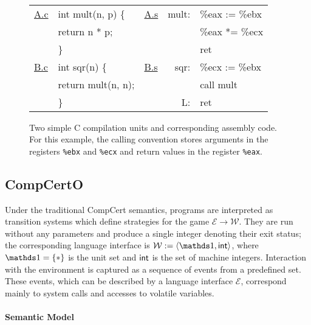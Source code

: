 \documentclass[sigplan,screen]{acmart}
\newcommand{\figsize}{\small}
\begin{document}
\begin{figure} %
  \figsize
  \tt
  \begin{tabular}{ll lr@{\ }l}
    \hline
    \underline{A.c} & int mult(n, p) \{ &
    \underline{A.s} & mult: & \%eax := \%ebx \\
                    & \quad return n * p; &
                    & & \%eax *= \%ecx \\
                    & \} &
                    & & ret \\
    \hline
    \underline{B.c} & int sqr(n) \{ &
    \underline{B.s} & sqr: & \%ecx := \%ebx \\
                    & \quad return mult(n, n); &
                    & & call mult \\
                    & \} &
                    & L: & ret \\
    \hline
  \end{tabular}
  \caption{Two simple C compilation units and corresponding assembly code.
    For this example,
    the calling convention stores arguments in
    the registers
    \texttt{\%ebx} and \texttt{\%ecx}
    and return values in
    the register
    \texttt{\%eax}.}
  \label{fig:abc}
\end{figure}



\subsection{CompCertO} \label{sec:mainideas:compcerto} %

Under the traditional CompCert semantics,
programs are interpreted as transition systems
which define strategies for the game
$\mathcal{E} \rightarrow \mathcal{W}$.
They are run without any parameters
and produce a single integer denoting their exit status;
the corresponding language interface is
$\mathcal{W} := \langle \unitset, \kw{int} \rangle$,
where $\unitset = \{ * \}$ is the unit set
and $ \mathsf{int} $ is the set of machine integers.
Interaction with the environment
is captured as a sequence of events from a predefined set.
These events,
which can be described by a language interface $\mathcal{E}$,
correspond mainly to system calls and accesses to volatile variables.

\paragraph{Semantic Model} %
\end{document}
